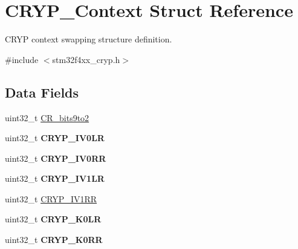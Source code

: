 \hypertarget{struct_c_r_y_p___context}{\section{C\-R\-Y\-P\-\_\-\-Context Struct Reference}
\label{struct_c_r_y_p___context}
}


C\-R\-Y\-P context swapping structure definition.  




{\ttfamily \#include $<$stm32f4xx\-\_\-cryp.\-h$>$}

\subsection*{Data Fields}
\begin{DoxyCompactItemize}
\item 
uint32\-\_\-t \hyperlink{struct_c_r_y_p___context_ae484ce34cd1730e9ffae9ec41365a948}{C\-R\-\_\-bits9to2}
\item 
\hypertarget{struct_c_r_y_p___context_a201dff8ef84ed6b78fde4acb3267e2e4}{uint32\-\_\-t {\bfseries C\-R\-Y\-P\-\_\-\-I\-V0\-L\-R}}\label{struct_c_r_y_p___context_a201dff8ef84ed6b78fde4acb3267e2e4}

\item 
\hypertarget{struct_c_r_y_p___context_a8de4557bf9c21ca9f48c9eefdceaadee}{uint32\-\_\-t {\bfseries C\-R\-Y\-P\-\_\-\-I\-V0\-R\-R}}\label{struct_c_r_y_p___context_a8de4557bf9c21ca9f48c9eefdceaadee}

\item 
\hypertarget{struct_c_r_y_p___context_ab536871d09c48b2298bf172d7283cca5}{uint32\-\_\-t {\bfseries C\-R\-Y\-P\-\_\-\-I\-V1\-L\-R}}\label{struct_c_r_y_p___context_ab536871d09c48b2298bf172d7283cca5}

\item 
uint32\-\_\-t \hyperlink{struct_c_r_y_p___context_aea9966b11be3f54fb553b02ab5af4b9d}{C\-R\-Y\-P\-\_\-\-I\-V1\-R\-R}
\item 
\hypertarget{struct_c_r_y_p___context_a39960d647fb0d5d3fb5ae610ca1231b6}{uint32\-\_\-t {\bfseries C\-R\-Y\-P\-\_\-\-K0\-L\-R}}\label{struct_c_r_y_p___context_a39960d647fb0d5d3fb5ae610ca1231b6}

\item 
\hypertarget{struct_c_r_y_p___context_a292e09a12bd72cdc39f1c355eb40a0c8}{uint32\-\_\-t {\bfseries C\-R\-Y\-P\-\_\-\-K0\-R\-R}}\label{struct_c_r_y_p___context_a292e09a12bd72cdc39f1c355eb40a0c8}


\end{DoxyCompactItemize}
